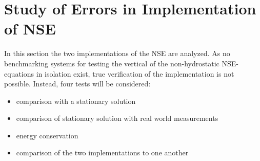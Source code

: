 

\section{Study of Errors in Implementation of NSE}
In this section the two implementations of the NSE are analyzed.
As no benchmarking systems for testing the vertical of the non-hydrostatic NSE-equations in isolation exist, true verification of the implementation is not possible.
Instead, four tests will be considered:
\begin{itemize}
\item comparison with a stationary solution
\item comparison of stationary solution with real world measurements
\item energy conservation
\item comparison of the two implementations to one another
\end{itemize}

